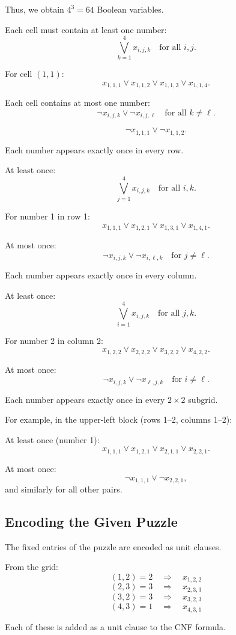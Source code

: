 \documentclass[12pt]{article}
\begin{document}
Thus, we obtain $4^3 = 64$ Boolean variables.


Each cell must contain at least one number:
\[
\bigvee_{k=1}^{4} x_{i,j,k}
\quad \text{for all } i,j.
\]

For cell $(1,1)$:
\[
x_{1,1,1} \lor x_{1,1,2} \lor x_{1,1,3} \lor x_{1,1,4}.
\]

Each cell contains at most one number:
\[
\neg x_{i,j,k} \lor \neg x_{i,j,\ell}
\quad \text{for all } k \neq \ell.
\]

\[
\neg x_{1,1,1} \lor \neg x_{1,1,2}.
\]


Each number appears exactly once in every row.

At least once:
\[
\bigvee_{j=1}^{4} x_{i,j,k}
\quad \text{for all } i,k.
\]

For number 1 in row 1:
\[
x_{1,1,1} \lor x_{1,2,1} \lor x_{1,3,1} \lor x_{1,4,1}.
\]

At most once:
\[
\neg x_{i,j,k} \lor \neg x_{i,\ell,k}
\quad \text{for } j \neq \ell.
\]


Each number appears exactly once in every column.

At least once:
\[
\bigvee_{i=1}^{4} x_{i,j,k}
\quad \text{for all } j,k.
\]

For number 2 in column 2:
\[
x_{1,2,2} \lor x_{2,2,2} \lor x_{3,2,2} \lor x_{4,2,2}.
\]

At most once:
\[
\neg x_{i,j,k} \lor \neg x_{\ell,j,k}
\quad \text{for } i \neq \ell.
\]


Each number appears exactly once in every $2 \times 2$ subgrid.

For example, in the upper-left block (rows 1--2, columns 1--2):

At least once (number 1):
\[
x_{1,1,1} \lor x_{1,2,1} \lor x_{2,1,1} \lor x_{2,2,1}.
\]

At most once:
\[
\neg x_{1,1,1} \lor \neg x_{2,2,1},
\]
and similarly for all other pairs.

\subsection*{Encoding the Given Puzzle}

The fixed entries of the puzzle are encoded as unit clauses.

From the grid:
\[
(1,2)=2 \quad \Rightarrow \quad x_{1,2,2}
\]
\[
(2,3)=3 \quad \Rightarrow \quad x_{2,3,3}
\]
\[
(3,2)=3 \quad \Rightarrow \quad x_{3,2,3}
\]
\[
(4,3)=1 \quad \Rightarrow \quad x_{4,3,1}
\]

Each of these is added as a unit clause to the CNF formula.
\end{document}
